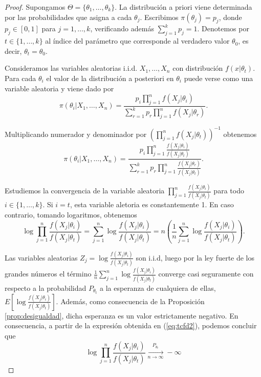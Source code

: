 \begin{proof}
	Supongamos $\Theta = \{\theta_1,\ldots,\theta_k\}$. La distribución a priori viene determinada por las probabilidades que asigna a cada $\theta_j$. Escribimos $\pi(\theta_j)=p_j$, donde $p_j\in[0,1]$ para $j=1,\ldots,k$, verificando además $\sum_{j=1}^{k}{p_j}=1$. Denotemos por $t\in\{1,\ldots,k\}$ al índice del parámetro que corresponde al verdadero valor $\theta_0$, es decir, $\theta_t = \theta_0$.


	Consideramos las variables aleatorias i.i.d. $X_1,\ldots,X_n$ con distribución $f(x|\theta_t)$. Para cada $\theta_i$ el valor de la distribución a posteriori en $\theta_i$ puede verse como una variable aleatoria y viene dado por
	\[\pi(\theta_i|X_1,\ldots,X_n) = \frac{p_i \prod_{j=1}^n{f(X_j|\theta_i)}}{\sum_{r=1}^k{p_r\prod_{j=1}^n{f(X_j|\theta_r)}}}.\]

	Multiplicando numerador y denominador por $\left(\prod_{j=1}^n{f(X_j|\theta_t)}\right)^{-1}$ obtenemos
	\begin{equation} \label{eq:tcfd1}
		\pi(\theta_i|X_1,\ldots,X_n) = \frac{p_i \prod_{j=1}^n{\frac{f(X_j|\theta_i)}{f(X_j|\theta_t)}}}{\sum_{r=1}^k{p_r\prod_{j=1}^n{\frac{f(X_j|\theta_r)}{f(X_j|\theta_t)}}}}.
	\end{equation}


	Estudiemos la convergencia de la variable aleatoria $\prod_{j=1}^n{\frac{f(X_j|\theta_i)}{f(X_j|\theta_t)}}$ para todo $i \in \{1, \ldots, k\}$. Si $i=t$, esta variable aletoria es constantemente 1. En caso contrario, tomando logaritmos, obtenemos
	\begin{equation} \label{eq:tcfd2}
	\log{\prod_{j=1}^n{\frac{f(X_j|\theta_i)}{f(X_j|\theta_t)}}} = \sum_{j=1}^{n}{ \log{\frac{f(X_j|\theta_i)}{f(X_j|\theta_t)}}} = n\left(\frac{1}{n}\sum_{j=1}^{n}{\log{\frac{f(X_j|\theta_i)}{f(X_j|\theta_t)}}}\right).
	\end{equation}

	Las variables aleatorias $Z_j = \log{\frac{f(X_j|\theta_i)}{f(X_j|\theta_t)}}$ son i.i.d, luego por la ley fuerte de los grandes números el término $\frac{1}{n}\sum_{j=1}^{n}{\log{\frac{f(X_j|\theta_i)}{f(X_j|\theta_t)}}}$ converge casi seguramente con respecto a la probabilidad $P_{\theta_t}$ a la esperanza de cualquiera de ellas, $E\left[\log{\frac{f(X_j|\theta_i)}{f(X_j|\theta_t)}}\right]$. Además, como consecuencia de la Proposición \ref{prop:desigualdad}, dicha esperanza es un valor estrictamente negativo. En consecuencia, a partir de la expresión obtenida en (\ref{eq:tcfd2}), podemos concluir que
	\[\log{\prod_{j=1}^n{\frac{f(X_j|\theta_i)}{f(X_j|\theta_t)}}} \xrightarrow[n\to\infty]{P_{\theta_t}} -\infty\]


\end{proof}
